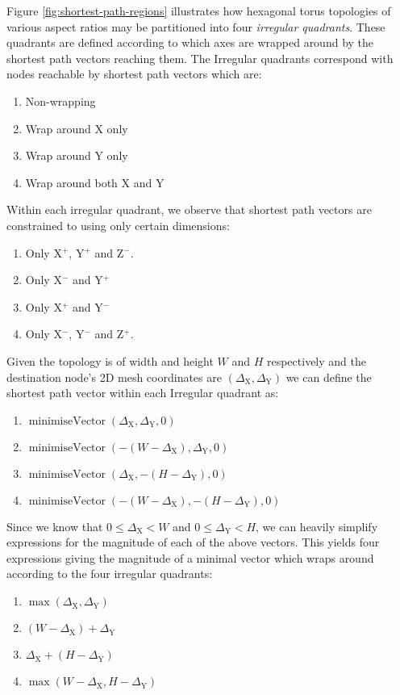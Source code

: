 			Figure \ref{fig:shortest-path-regions} illustrates how hexagonal torus
			topologies of various aspect ratios may be partitioned into four
			\emph{irregular quadrants}. These quadrants are defined according to which
			axes are wrapped around by the shortest path vectors reaching them. The
			Irregular quadrants correspond with nodes reachable by shortest path
			vectors which are:
			\begin{enumerate}
				\item Non-wrapping
				\item Wrap around X only
				\item Wrap around Y only
				\item Wrap around both X and Y
			\end{enumerate}
			Within each irregular quadrant, we observe that shortest path vectors are
			constrained to using only certain dimensions:
			\begin{enumerate}
				\item Only X$^+$, Y$^+$ and Z$^-$.
				\item Only X$^-$ and Y$^+$
				\item Only X$^+$ and Y$^-$
				\item Only X$^-$, Y$^-$ and Z$^+$.
			\end{enumerate}
			Given the topology is of width and height $W$ and $H$ respectively and the
			destination node's 2D mesh coordinates are $(\Delta_\textrm{X},
			\Delta_\textrm{Y})$ we can define the shortest path vector within each
			Irregular quadrant as:
			\begin{enumerate}
				\item $\operatorname{minimiseVector}(\Delta_\textrm{X},\Delta_\textrm{Y},0)$
				\item $\operatorname{minimiseVector}(-(W-\Delta_\textrm{X}),\Delta_\textrm{Y},0)$
				\item $\operatorname{minimiseVector}(\Delta_\textrm{X},-(H-\Delta_\textrm{Y}),0)$
				\item $\operatorname{minimiseVector}(-(W-\Delta_\textrm{X}),-(H-\Delta_\textrm{Y}),0)$
			\end{enumerate}
			Since we know that $0 \le \Delta_\textrm{X} < W$ and $0 \le
			\Delta_\textrm{Y} < H$, we can heavily simplify expressions for the
			magnitude of each of the above vectors. This yields four expressions giving
			the magnitude of a minimal vector which wraps around according to the four
			irregular quadrants:
			\begin{enumerate}
				\item $\operatorname{max}(\Delta_\textrm{X}, \Delta_\textrm{Y})$
				\item $(W - \Delta_\textrm{X}) + \Delta_\textrm{Y}$
				\item $\Delta_\textrm{X} + (H - \Delta_\textrm{Y})$
				\item $\operatorname{max}(W-\Delta_\textrm{X}, H-\Delta_\textrm{Y})$
			\end{enumerate}
